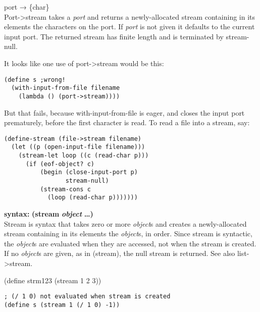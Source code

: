 \begin{entry}{%
  }

  port → \{char\}\\
  Port->stream takes a \emph{port} and returns a newly-allocated
  stream containing in its elements the characters on the port. If
  \emph{port} is not given it defaults to the current input port.  The
  returned stream has finite length and is terminated by stream-null.

  It looks like one use of port->stream would be this:

\begin{verbatim}
(define s ;wrong!
  (with-input-from-file filename
    (lambda () (port->stream))))
\end{verbatim}

  But that fails, because with-input-from-file is eager, and closes
  the input port prematurely, before the first character is read. To
  read a file into a stream, say:

\begin{verbatim}
(define-stream (file->stream filename)
  (let ((p (open-input-file filename)))
    (stream-let loop ((c (read-char p)))
      (if (eof-object? c)
          (begin (close-input-port p)
                 stream-null)
          (stream-cons c
            (loop (read-char p)))))))
\end{verbatim}
\end{entry}
\textbf{syntax:} \textbf{(stream} \textbf{\emph{object}}
\textbf{\ldots{})}\\
Stream is syntax that takes zero or more \emph{object}s and creates a
newly-allocated stream containing in its elements the \emph{object}s, in
order. Since stream is syntactic, the \emph{object}s are evaluated when
they are accessed, not when the stream is created. If no \emph{object}s
are given, as in (stream), the null stream is returned. See also
list->stream.

(define strm123 (stream 1 2 3))

\begin{verbatim}
; (/ 1 0) not evaluated when stream is created
(define s (stream 1 (/ 1 0) -1))
\end{verbatim}

